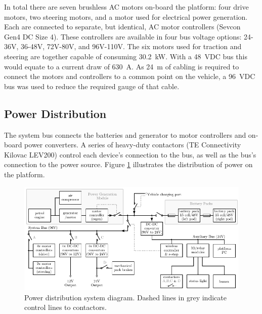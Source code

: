 \documentclass[preprint,authoryear,12pt]{elsarticle}
\begin{document}

        In total there are seven brushless AC motors on-board the platform: four drive motors, two steering motors, and a motor used for electrical power generation.
        Each are connected to separate, but identical, AC motor controllers (Sevcon Gen4 DC Size 4).
        These controllers are available in four bus voltage options: 24-36V, 36-48V, 72V-80V, and 96V-110V.
        The six motors used for traction and steering are together capable of consuming \SI{30.2}{\kilo\watt}.
        With a \SI{48}{\volt}DC bus this would equate to a current draw of \SI{630}{\ampere}.
        As \SI{24}{\meter} of cabling is required to connect the motors and controllers to a common point on the vehicle, a \SI{96}{\volt}DC bus was used to reduce the required gauge of that cable.


    \subsection{Power Distribution}
    \label{sub:power}
        The system bus connects the batteries and generator to motor controllers and on-board power converters.
        A series of heavy-duty contactors (TE Connectivity Kilovac LEV200) control each device's connection to the bus, as well as the bus's connection to the power source.
        Figure \ref{fig:power_system_diagram} illustrates the distribution of power on the platform.

        \begin{figure}[htb]
            \centering
            \includegraphics[width=\linewidth]{imgs/system_diagram/full-system-diagram_v1.pdf}
            \caption{Power distribution system diagram. Dashed lines in grey indicate control lines to contactors.}
            \label{fig:power_system_diagram}
        \end{figure}
\end{document}
